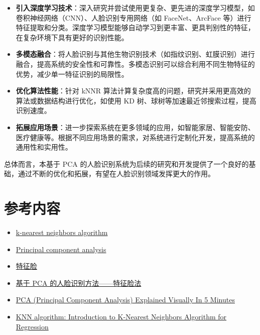 \documentclass{article}
\begin{document}
\begin{itemize}
    \item \textbf{引入深度学习技术}：深入研究并尝试使用更复杂、更先进的深度学习模型，如卷积神经网络（CNN）、人脸识别专用网络（如 FaceNet、ArcFace 等）进行特征提取和分类。深度学习模型能够自动学习到更丰富、更具判别性的特征，在复杂环境下具有更好的识别性能。
    \item \textbf{多模态融合}：将人脸识别与其他生物识别技术（如指纹识别、虹膜识别）进行融合，提高系统的安全性和可靠性。多模态识别可以综合利用不同生物特征的优势，减少单一特征识别的局限性。
    \item \textbf{优化算法性能}：针对 kNNR 算法计算复杂度高的问题，研究并采用更高效的算法或数据结构进行优化，如使用 KD 树、球树等加速最近邻搜索过程，提高识别速度。
    \item \textbf{拓展应用场景}：进一步探索系统在更多领域的应用，如智能家居、智能安防、医疗健康等。根据不同应用场景的需求，对系统进行定制化开发，提高系统的通用性和实用性。
\end{itemize}

总体而言，本基于 PCA 的人脸识别系统为后续的研究和开发提供了一个良好的基础，通过不断的优化和拓展，有望在人脸识别领域发挥更大的作用。

\section*{参考内容}
\begin{itemize}
    \item \href{https://en.wikipedia.org/wiki/K-nearest_neighbors_algorithm}{k-nearest neighbors algorithm}
    \item \href{https://en.wikipedia.org/wiki/Principal_component_analysis}{Principal component analysis}
    \item \href{https://zh.wikipedia.org/wiki/%E7%89%B9%E5%BE%81%E8%84%B8}{特征脸}
    \item \href{https://zhuanlan.zhihu.com/p/356640804}{基于 PCA 的人脸识别方法——特征脸法}
    \item \href{https://medium.com/towards-data-science/pca-principal-component-analysis-explained-visually-in-5-minutes-20ce8a9ebf0f}{PCA (Principal Component Analysis) Explained Visually In 5 Minutes}
    \item \href{https://www.analyticsvidhya.com/blog/2018/08/k-nearest-neighbor-introduction-regression-python}{KNN algorithm: Introduction to K-Nearest Neighbors Algorithm for Regression}
\end{itemize}
\end{document}
